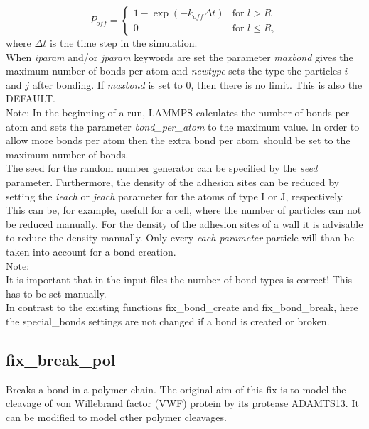 \begin{equation}
P_{off}  = 
\begin{cases}

1 - \exp(-k_{off}\Delta t) & \text{for } l > R\\
 0  & \text{for } l \le R,

\end{cases}
\end{equation}
where $\Delta t$ is the time step in the simulation.
\\[2ex]
When \textit{iparam} and/or \textit{jparam} keywords are set the parameter \textit{maxbond} gives the maximum number of bonds per atom and \textit{newtype} sets the type the particles $i$ and $j$ after bonding.
If \textit{maxbond} is set to 0, then there is no limit. 
This is also the DEFAULT.\\
Note: In the beginning of a run, LAMMPS calculates the number of bonds per atom and sets the parameter \textit{bond\_per\_atom} to the maximum value.
In order to allow more bonds per atom then the \glqq extra bond per atom\grqq\ should be set to the maximum number of bonds. 
\\[2ex]
The seed for the random number generator can be specified by the \textit{seed} parameter.
Furthermore, the density of the adhesion sites can be reduced by setting the \textit{ieach} or \textit{jeach} parameter for the atoms of type I or J, respectively.
This can be, for example, usefull for a cell, where the number of particles can not be reduced manually.
For the density of the adhesion sites of a wall it is advisable to reduce the density manually.
Only every \textit{each-parameter} particle will than be taken into account for a bond creation.
\\[2ex]
Note:\\[1ex]
It is important that in the input files the number of bond types is correct! This has to be set manually.
\\[1ex]
In contrast to the existing functions fix\_bond\_create and fix\_bond\_break, here the special\_bonds settings are not changed if a bond is created or broken. 

\subsection{fix\_break\_pol}
\label{sub:fix_break_pol}

  Breaks a bond in a polymer chain. The original aim of this fix is to model the cleavage of von Willebrand factor (VWF) protein by its protease ADAMTS13. It can be modified to model other polymer cleavages.
  
